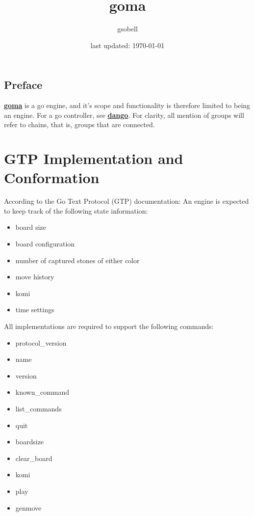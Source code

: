 \documentclass[11pt]{article}
\title{\textbf{goma}}
\author{gsobell}
\date{last updated: \today}
\begin{document}
\maketitle
\tableofcontents
\newpage


\subsection{Preface}
\href{https://github.com/gsobell/goma}{\textbf{goma}} is a go engine, and it's scope and functionality is therefore limited to being an engine. For a go controller, see \href{https://github.com/gsobell/dango}{\textbf{dango}}. For clarity, all mention of groups will refer to chains, that is, groups that are connected.

\section{GTP Implementation and Conformation}
According to the Go Text Protocol (GTP) documentation:
An engine is expected to keep track of the following state information:

\begin{itemize}
\item board size
\item board configuration
\item number of captured stones of either color
\item move history
\item komi
\item time settings
\end{itemize}
All implementations are required to support the following commands:

\begin{multicols}{2}
\begin{itemize}
\item protocol\_version
\item name
\item version
\item known\_command
\item list\_commands
\item quit
\item boardsize
\item clear\_board
\item komi
\item play
\item genmove
\end{itemize}
\end{multicols}
\end{document}
